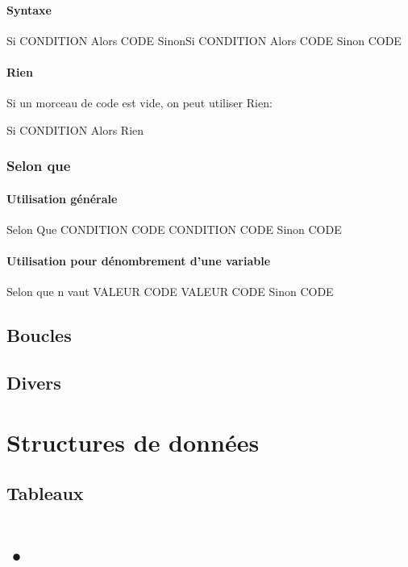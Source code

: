 \documentclass[10pt,a4paper,french]{article}
\begin{document}
\paragraph{Syntaxe}
\begin{exalgo}
Si CONDITION Alors
    CODE
SinonSi CONDITION Alors
    CODE
Sinon
    CODE
\end{exalgo}

\paragraph{Rien}
Si un morceau de code est vide, on peut utiliser Rien:
\begin{exalgo}
Si CONDITION Alors
    Rien
\end{exalgo}

\subsubsection{Selon que}

\paragraph{Utilisation générale}
\begin{exalgo}
Selon Que
    CONDITION
        CODE
    CONDITION
        CODE
    Sinon
        CODE
\end{exalgo}

\paragraph{Utilisation pour dénombrement d'une variable}
\begin{exalgo}
Selon que n vaut
    VALEUR
        CODE
    VALEUR
        CODE
    Sinon
        CODE
\end{exalgo}

\subsection{Boucles}

\subsection{Divers}

\section{Structures de données}

\subsection{Tableaux}

\section{•}
\end{document}
